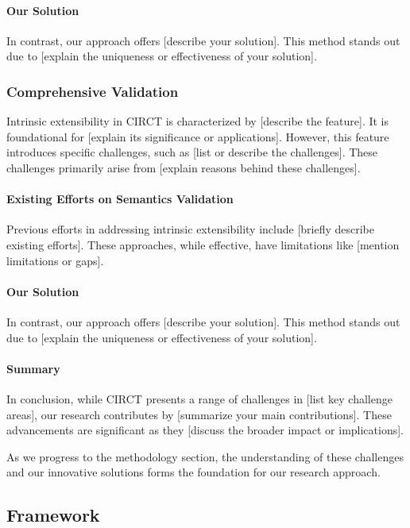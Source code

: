 \paragraph{Our Solution}
\ToWrite{}
In contrast, our approach offers [describe your solution]. This method stands out due to [explain the uniqueness or effectiveness of your solution].


\subsubsection{Comprehensive Validation}
Intrinsic extensibility in CIRCT is characterized by [describe the feature]. It is foundational for [explain its significance or applications].
However, this feature introduces specific challenges, such as [list or describe the challenges]. These challenges primarily arise from [explain reasons behind these challenges].

\paragraph{Existing Efforts on Semantics Validation}
\ToWrite{}
Previous efforts in addressing intrinsic extensibility include [briefly describe existing efforts]. These approaches, while effective, have limitations like [mention limitations or gaps].

\paragraph{Our Solution}
\ToWrite{}
In contrast, our approach offers [describe your solution]. This method stands out due to [explain the uniqueness or effectiveness of your solution].


\paragraph{Summary}
In conclusion, while CIRCT presents a range of challenges in [list key challenge areas], our research contributes by [summarize your main contributions]. These advancements are significant as they [discuss the broader impact or implications].

As we progress to the methodology section, the understanding of these challenges and our innovative solutions forms the foundation for our research approach.

\subsection[K Framework]{{\K} Framework}

